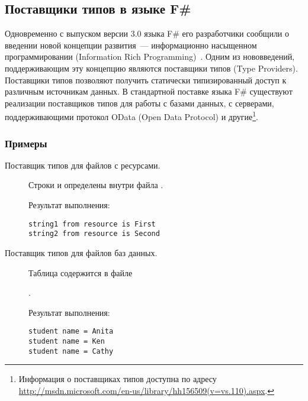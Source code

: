 \subsection{Поставщики типов в языке F\#}\label{f-sharp-type-providers}
Одновременно с выпуском версии 3.0 языка F\# его разработчики сообщили о введении новой концепции развития~--- информационно насыщенном программировании (Information Rich Programming)~\cite{joepamer2011}.
Одним из нововведений, поддерживающим эту концепцию являются поставщики типов (Type Providers).
Поставщики типов позволяют получить статически типизированный доступ к различным источникам данных.
В стандартной поставке языка F\# существуют реализации поставщиков типов для работы с базами данных, с серверами, поддерживающими протокол OData (Open Data Protocol) и другие\footnote{Информация о поставщиках типов доступна по адресу \url{http://msdn.microsoft.com/en-us/library/hh156509(v=vs.110).aspx}.}.

\subsubsection{Примеры}
\begin{description}
\item[Поставщик типов для файлов с ресурсами.] Строки  и  определены внутри файла .


Результат выполнения:
\begin{lstlisting}
string1 from resource is First
string2 from resource is Second
\end{lstlisting}

\item[Поставщик типов для файлов баз данных.] Таблица  содержится в файле 

.


Результат выполнения:
\begin{lstlisting}
student name = Anita
student name = Ken
student name = Cathy
\end{lstlisting}

\end{description}    